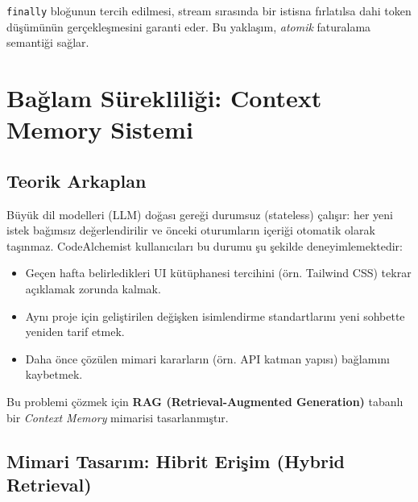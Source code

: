 \documentclass[12pt,a4paper]{article}
\begin{document}
\begin{notebox}
\texttt{finally} bloğunun tercih edilmesi, stream sırasında bir istisna fırlatılsa dahi token düşümünün gerçekleşmesini garanti eder. Bu yaklaşım, \emph{atomik} faturalama semantiği sağlar.
\end{notebox}

\section{Bağlam Sürekliliği: Context Memory Sistemi}

\subsection{Teorik Arkaplan}

Büyük dil modelleri (LLM) doğası gereği durumsuz (stateless) çalışır: her yeni istek bağımsız değerlendirilir ve önceki oturumların içeriği otomatik olarak taşınmaz. CodeAlchemist kullanıcıları bu durumu şu şekilde deneyimlemektedir:

\begin{itemize}[leftmargin=2em]
    \item Geçen hafta belirledikleri UI kütüphanesi tercihini (örn. Tailwind CSS) tekrar açıklamak zorunda kalmak.
    \item Aynı proje için geliştirilen değişken isimlendirme standartlarını yeni sohbette yeniden tarif etmek.
    \item Daha önce çözülen mimari kararların (örn. API katman yapısı) bağlamını kaybetmek.
\end{itemize}

Bu problemi çözmek için \textbf{RAG (Retrieval-Augmented Generation)} tabanlı bir \emph{Context Memory} mimarisi tasarlanmıştır.

\subsection{Mimari Tasarım: Hibrit Erişim (Hybrid Retrieval)}
\end{document}
